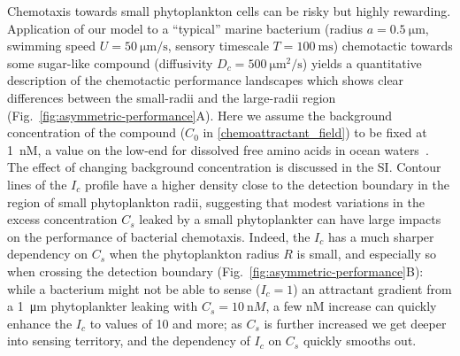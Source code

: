 \documentclass[9pt,twocolumn,twoside]{pnas-new}
\begin{document}
Chemotaxis towards small phytoplankton cells can be risky but highly rewarding.
Application of our model to a ``typical'' marine bacterium (radius $a=\SI{0.5}{\micro\m}$, swimming speed $U=\SI{50}{\micro\m\per\s}$, sensory timescale $T=\SI{100}{\milli\s}$) chemotactic towards some sugar-like compound (diffusivity $D_c=\SI{500}{\micro\m^2\per\s}$) yields a quantitative description of the chemotactic performance landscapes which shows clear differences between the small-radii and the large-radii region (Fig.~\ref{fig:asymmetric-performance}A).
Here we assume the background concentration of the compound ($C_0$ in \autoref{chemoattractant_field}) to be fixed at \SI{1}{\nano M}, a value on the low-end for dissolved free amino acids in ocean waters~\cite{lee1975amino}. The effect of changing background concentration is discussed in the SI.
Contour lines of the $I_c$ profile have a higher density close to the detection boundary in the region of small phytoplankton radii, suggesting that modest variations in the excess concentration $C_s$ leaked by a small phytoplankter can have large impacts on the performance of bacterial chemotaxis.
Indeed, the $I_c$ has a much sharper dependency on $C_s$ when the phytoplankton radius $R$ is small, and especially so when crossing the detection boundary (Fig.~\ref{fig:asymmetric-performance}B): while a bacterium might not be able to sense ($I_c=1$) an attractant gradient from a \SI{1}{\micro\m} phytoplankter leaking with $C_s=\SI{10}{\nano M}$, a few \si{\nano M} increase can quickly enhance the $I_c$ to values of 10 and more; as $C_s$ is further increased we get deeper into sensing territory, and the dependency of $I_c$ on $C_s$ quickly smooths out.
\end{document}
